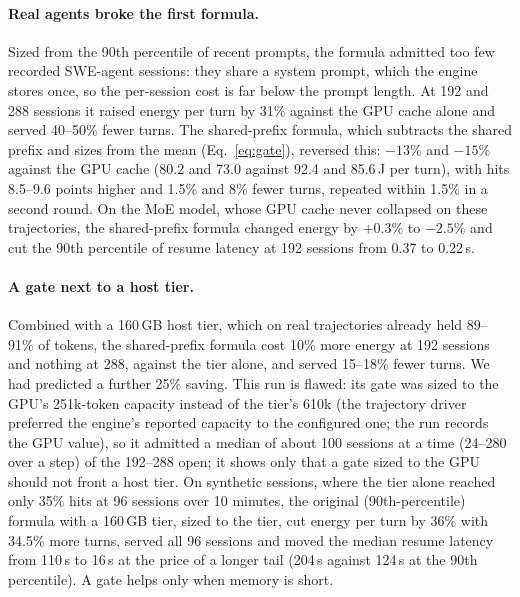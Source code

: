 \paragraph{Real agents broke the first formula.} Sized from the 90th percentile of recent prompts, the formula admitted
too few recorded SWE-agent sessions: they share a system prompt, which the engine stores once, so the per-session cost
is far below the prompt length. At 192 and 288 sessions it raised energy per turn by 31\% against the GPU cache alone
and served 40--50\% fewer turns. The shared-prefix formula, which subtracts the shared prefix and sizes from the mean (Eq.~\eqref{eq:gate}), reversed
this: $-13\%$ and $-15\%$ against the GPU cache (80.2 and 73.0 against 92.4 and 85.6\,J per turn), with hits 8.5--9.6
points higher and 1.5\% and 8\% fewer turns, repeated within 1.5\% in a second round. On the MoE model, whose GPU cache
never collapsed on these trajectories, the shared-prefix formula changed energy by $+0.3\%$ to $-2.5\%$ and cut the 90th
percentile of resume latency at 192 sessions from 0.37 to 0.22\,s.

\paragraph{A gate next to a host tier.} Combined with a 160\,GB host tier, which on
real trajectories already held 89--91\% of tokens, the shared-prefix formula cost 10\% more energy at 192 sessions and nothing at 288,
against the tier alone, and served 15--18\% fewer turns. We had predicted a further 25\% saving. This run is flawed: its
gate was sized to the GPU's 251k-token capacity instead of the tier's 610k (the trajectory driver preferred the engine's reported capacity to the configured one; the run records the GPU
value), so it
admitted a median of about 100 sessions at a time (24--280 over a step) of the 192--288 open; it shows only that a gate sized to the GPU should not front a host tier. On synthetic sessions, where the tier alone reached only
35\% hits at 96 sessions over 10 minutes, the original (90th-percentile) formula with a 160\,GB tier, sized to the tier, cut energy per turn by 36\% with 34.5\% more turns,
served all 96 sessions and moved the median resume latency from 110\,s to 16\,s at the price of a longer tail (204\,s
against 124\,s at the 90th percentile). A gate helps only when memory is short.

